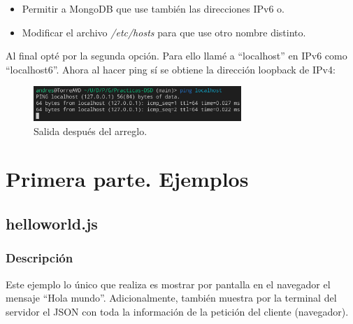 \documentclass{article}
\begin{document}
\begin{itemize}
    \item Permitir a MongoDB que use también las direcciones IPv6 o.
    
    \item Modificar el archivo \textit{/etc/hosts} para que use otro nombre distinto.
\end{itemize}

Al final opté por la segunda opción. Para ello llamé a ``localhost'' en IPv6 como ``localhost6''. Ahora al hacer ping sí se obtiene la dirección loopback de IPv4:

\begin{figure}[H]
    \centering
    \includegraphics[width=0.7\textwidth]{images/pingOk.png}
    \caption{Salida después del arreglo.}
\end{figure}


\newpage

\section{Primera parte. Ejemplos}
\subsection{helloworld.js}
\subsubsection{Descripción}
Este ejemplo lo único que realiza es mostrar por pantalla en el navegador el mensaje ``Hola mundo''. Adicionalmente, también muestra por la terminal del servidor el JSON con toda la información de la petición del cliente (navegador).
\end{document}
